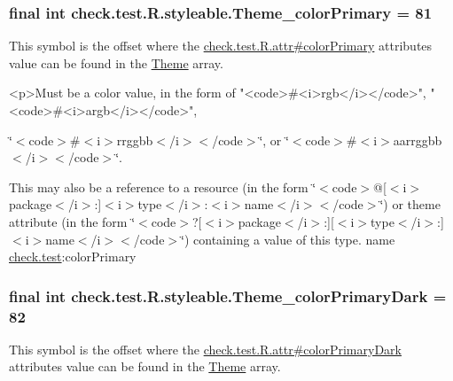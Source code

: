 \subsubsection[{Theme\+\_\+color\+Primary}]{\setlength{\rightskip}{0pt plus 5cm}final int check.\+test.\+R.\+styleable.\+Theme\+\_\+color\+Primary = 81\hspace{0.3cm}{\ttfamily [static]}}\label{classcheck_1_1test_1_1_r_1_1styleable_add0a3bacfd686c812b1d7045c47b17d5}
This symbol is the offset where the \hyperlink{classcheck_1_1test_1_1_r_1_1attr_a0b0ddf92c45ba1dc992336304fdcd1f9}{check.\+test.\+R.\+attr\#color\+Primary} attribute\textquotesingle{}s value can be found in the \hyperlink{classcheck_1_1test_1_1_r_1_1styleable_acca726d02016a0cf607782ec3a436a81}{Theme} array.

\begin{DoxyVerb}      <p>Must be a color value, in the form of "<code>#<i>rgb</i></code>", "<code>#<i>argb</i></code>",
\end{DoxyVerb}
 \char`\"{}$<$code$>$\#$<$i$>$rrggbb$<$/i$>$$<$/code$>$\char`\"{}, or \char`\"{}$<$code$>$\#$<$i$>$aarrggbb$<$/i$>$$<$/code$>$\char`\"{}. 

This may also be a reference to a resource (in the form \char`\"{}$<$code$>$@\mbox{[}$<$i$>$package$<$/i$>$\+:\mbox{]}$<$i$>$type$<$/i$>$\+:$<$i$>$name$<$/i$>$$<$/code$>$\char`\"{}) or theme attribute (in the form \char`\"{}$<$code$>$?\mbox{[}$<$i$>$package$<$/i$>$\+:\mbox{]}\mbox{[}$<$i$>$type$<$/i$>$\+:\mbox{]}$<$i$>$name$<$/i$>$$<$/code$>$\char`\"{}) containing a value of this type.  name \hyperlink{namespacecheck_1_1test}{check.\+test}\+:color\+Primary \hypertarget{classcheck_1_1test_1_1_r_1_1styleable_a06639297583ba9162a788c3513b9266c}{}
\subsubsection[{Theme\+\_\+color\+Primary\+Dark}]{\setlength{\rightskip}{0pt plus 5cm}final int check.\+test.\+R.\+styleable.\+Theme\+\_\+color\+Primary\+Dark = 82\hspace{0.3cm}{\ttfamily [static]}}\label{classcheck_1_1test_1_1_r_1_1styleable_a06639297583ba9162a788c3513b9266c}
This symbol is the offset where the \hyperlink{classcheck_1_1test_1_1_r_1_1attr_a2a07aa51383e02b9f388ec5ac6cd9b99}{check.\+test.\+R.\+attr\#color\+Primary\+Dark} attribute\textquotesingle{}s value can be found in the \hyperlink{classcheck_1_1test_1_1_r_1_1styleable_acca726d02016a0cf607782ec3a436a81}{Theme} array.

